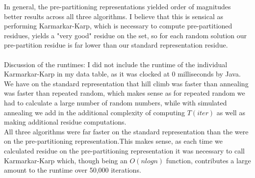 \documentclass[10.5pt,letter]{article}
\begin{document}
In general, the pre-partitioning representations yielded order of magnitudes better results across all three algorithms. I believe that this is sensical as performing Karmarkar-Karp, which is necessary to compute pre-partitioned residues, yields a "very good" residue on the set, so for each random solution our pre-partition residue is far lower than our standard representation residue. \\ \\
Discussion of the runtimes: I did not include the runtime of the individual Karmarkar-Karp in my data table, as it was clocked at $0$ milliseconds by Java. We have on the standard representation that hill climb was faster than annealing was faster than repeated random, which makes sense as for repeated random we had to calculate a large number of random numbers, while with simulated annealing we add in the additional complexity of computing $T(iter)$ as well as making additional residue computations. \\
All three algorithms were far faster on the standard representation than the were on the pre-partitioning representation.This makes sense, as each time we calculated residue on the pre-partitioning representation it was necessary to call Karmarkar-Karp which, though being an $O(nlogn)$ function, contributes a large amount to the runtime over 50,000 iterations. \\ \\
\end{document}
